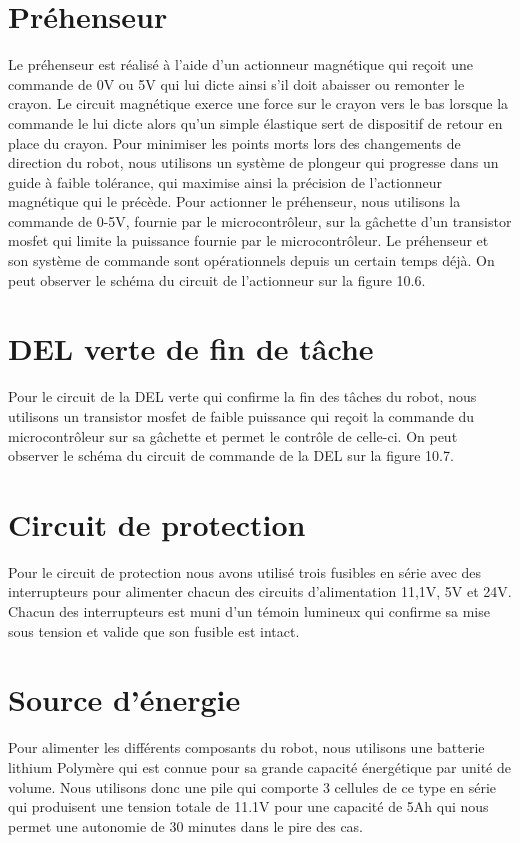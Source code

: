 \section{Préhenseur}
Le préhenseur est réalisé à l’aide d’un actionneur magnétique qui reçoit une commande de 0V ou 5V qui lui dicte ainsi s’il doit abaisser ou remonter le crayon. Le circuit magnétique exerce une force sur le crayon vers le bas lorsque la commande le lui dicte alors qu’un simple élastique sert de dispositif de retour en place du crayon. Pour minimiser les points morts lors des changements de direction du robot, nous utilisons un système de plongeur qui progresse dans un guide à faible tolérance,  qui maximise ainsi la précision de l’actionneur magnétique qui le précède. Pour actionner le préhenseur, nous utilisons la commande de 0-5V, fournie par le microcontrôleur, sur la gâchette d’un transistor mosfet qui limite la puissance fournie par le microcontrôleur. Le préhenseur et son système de commande sont opérationnels depuis un certain temps déjà. On peut observer le schéma du circuit de l’actionneur sur la figure 10.6.

\section{DEL verte de fin de tâche}
Pour le circuit de la DEL verte qui confirme la fin des tâches du robot, nous utilisons un transistor mosfet de faible puissance qui reçoit la commande du microcontrôleur sur sa gâchette et permet le contrôle de celle-ci. On peut observer le schéma du circuit de commande de la DEL sur la figure 10.7.

\section{Circuit de protection}
Pour le circuit de protection nous avons utilisé trois fusibles en série avec des interrupteurs pour alimenter chacun des circuits d’alimentation 11,1V, 5V et 24V. Chacun des interrupteurs est muni d’un témoin lumineux qui confirme sa mise sous tension et valide que son fusible est intact.

\section{Source d'énergie}
Pour alimenter les différents composants du robot, nous utilisons une batterie lithium Polymère qui est connue pour sa grande capacité énergétique par unité de volume. Nous utilisons donc une pile qui comporte 3 cellules de ce type en série qui produisent une tension totale de 11.1V pour une capacité de 5Ah qui nous permet une autonomie de 30 minutes dans le pire des cas.


